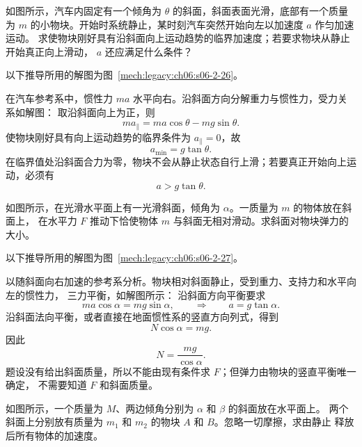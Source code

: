 {\begin{origexamplebox}{}\label{ch06:ex:s06-2-26}
如图所示，汽车内固定有一个倾角为 $\theta$ 的斜面，斜面表面光滑，底部有一个质量为
$m$ 的小物块。开始时系统静止，某时刻汽车突然开始向左以加速度 $a$ 作匀加速运动。
求使物块刚好具有沿斜面向上运动趋势的临界加速度；若要求物块从静止开始真正向上滑动，
$a$ 还应满足什么条件？
\probdiagTwoTwentySix
\end{origexamplebox}

\begin{xesolution}
以下推导所用的解图为图~\ref{mech:legacy:ch06:s06-2-26}。

在汽车参考系中，惯性力 $ma$ 水平向右。沿斜面方向分解重力与惯性力，受力关系如解图：
\soldiagTwoTwentySix
取沿斜面向上为正，则
\[
 ma_{\parallel}=ma\cos\theta-mg\sin\theta.
\]
使物块刚好具有向上运动趋势的临界条件为 $a_{\parallel}=0$，故
\[
 \boxed{a_{\min}=g\tan\theta}.
\]
在临界值处沿斜面合力为零，物块不会从静止状态自行上滑；若要真正开始向上运动，必须有
\[
 \boxed{a>g\tan\theta}.
\]
\end{xesolution}

\begin{origexamplebox}{}\label{ch06:ex:s06-2-27}
如图所示，在光滑水平面上有一光滑斜面，倾角为 $\alpha$。一质量为 $m$ 的物体放在斜面上，
在水平力 $F$ 推动下恰使物体 $m$ 与斜面无相对滑动。求斜面对物块弹力的大小。
\probdiagTwoTwentySeven
\end{origexamplebox}

\begin{xesolution}
以下推导所用的解图为图~\ref{mech:legacy:ch06:s06-2-27}。

以随斜面向右加速的参考系分析。物块相对斜面静止，受到重力、支持力和水平向左的惯性力，
三力平衡，如解图所示：
\soldiagTwoTwentySeven
沿斜面方向平衡要求
\[
 ma\cos\alpha=mg\sin\alpha,
 \qquad\Rightarrow\qquad a=g\tan\alpha.
\]
沿斜面法向平衡，或者直接在地面惯性系的竖直方向列式，得到
\[
 N\cos\alpha=mg.
\]
因此
\[
 \boxed{N=\frac{mg}{\cos\alpha}}.
\]
题设没有给出斜面质量，所以不能由现有条件求 $F$；但弹力由物块的竖直平衡唯一确定，
不需要知道 $F$ 和斜面质量。
\end{xesolution}

\begin{origexamplebox}{}\label{ch06:ex:s06-2-28}
如图所示，一个质量为 $M$、两边倾角分别为 $\alpha$ 和 $\beta$ 的斜面放在水平面上。
两个斜面上分别放有质量为 $m_1$ 和 $m_2$ 的物块 $A$ 和 $B$。忽略一切摩擦，求由静止
释放后所有物体的加速度。
\probdiagTwoTwentyEight
\end{origexamplebox}

}
